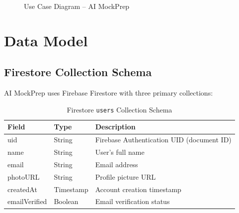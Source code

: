\documentclass[12pt,a4paper,oneside]{report}
\begin{document}
\begin{figure}[H]
\centering
{}
\caption{Use Case Diagram -- AI MockPrep}
\label{fig:use_case}
\end{figure}


\section{Data Model}
\label{sec:data_model}

\subsection{Firestore Collection Schema}

AI MockPrep uses Firebase Firestore with three primary collections:

\begin{table}[H]
\centering
\caption{Firestore \texttt{users} Collection Schema}
\label{tab:schema_users}
\begin{tabular}{|p{3.5cm}|p{2.5cm}|p{7cm}|}
\hline
\textbf{Field} & \textbf{Type} & \textbf{Description} \\
\hline
uid & String & Firebase Authentication UID (document ID) \\
\hline
name & String & User's full name \\
\hline
email & String & Email address \\
\hline
photoURL & String & Profile picture URL \\
\hline
createdAt & Timestamp & Account creation timestamp \\
\hline
emailVerified & Boolean & Email verification status \\
\hline
\end{tabular}
\end{table}
\end{document}
